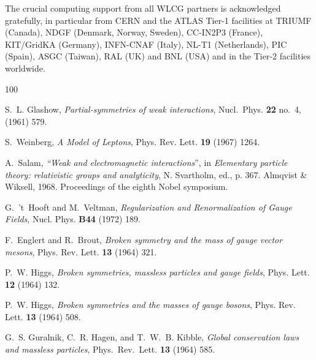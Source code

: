 \documentclass[final,3p,times,twocolumn]{elsarticle}
\begin{document}
The crucial computing support from all WLCG partners is acknowledged
gratefully, in particular from CERN and the ATLAS Tier-1 facilities at
TRIUMF (Canada), NDGF (Denmark, Norway, Sweden), CC-IN2P3 (France),
KIT/GridKA (Germany), INFN-CNAF (Italy), NL-T1 (Netherlands), PIC (Spain),
ASGC (Taiwan), RAL (UK) and BNL (USA) and in the Tier-2 facilities
worldwide.



 
\providecommand{\href}[2]{#2}\begingroup\raggedright\begin{thebibliography}{100}

S.~L. Glashow, {\em Partial-symmetries of weak interactions},
  \href{http://dx.doi.org/10.1016/0029-5582(61)90469-2}{Nucl.~Phys. {\bfseries
  22} no.~4, (1961) 579}.

{S.~Weinberg}, {\em A Model of Leptons},
  \href{http://dx.doi.org/10.1103/PhysRevLett.19.1264}{Phys. Rev. Lett.
  {\bfseries 19} (1967) 1264}.

A.~Salam, {\em ``Weak and electromagnetic interactions}'', in {\em Elementary particle theory: relativistic groups and analyticity}, N. Svartholm, ed., p. 367. Almqvist {\&} Wiksell, 1968. Proceedings of the eighth Nobel symposium.

G.~'t~Hooft and M.~Veltman, {\em {Regularization and Renormalization of Gauge
  Fields}}, \href{http://dx.doi.org/10.1016/0550-3213(72)90279-9}{Nucl. Phys.
  {\bfseries B44} (1972) 189}.

F.~Englert and R.~Brout, {\em {Broken symmetry and the mass of gauge vector
  mesons}}, \href{http://dx.doi.org/10.1103/PhysRevLett.13.321}{Phys. Rev.
  Lett. {\bfseries 13} (1964) 321}.

P.~W. Higgs, {\em {Broken symmetries, massless particles and gauge fields}},
  \href{http://dx.doi.org/10.1016/0031-9163(64)91136-9}{Phys. Lett. {\bfseries
  12} (1964) 132}.

P.~W. Higgs, {\em {Broken symmetries and the masses of gauge bosons}},
  \href{http://dx.doi.org/10.1103/PhysRevLett.13.508}{Phys. Rev. Lett.
  {\bfseries 13} (1964) 508}.

G.~S. Guralnik, C.~R. Hagen, and T.~W.~B. Kibble, {\em Global conservation laws
  and massless particles},
  \href{http://dx.doi.org/10.1103/PhysRevLett.13.585}{Phys.\ Rev.\ Lett.
  {\bfseries 13} (1964) 585}.


\end{thebibliography}
\end{document}
